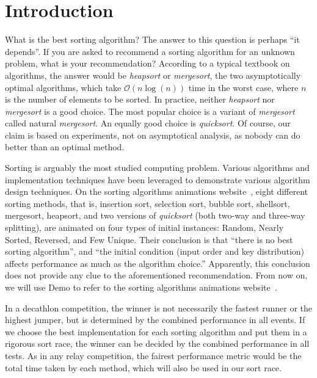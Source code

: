 \documentclass[AMA,STIX1COL]{WileyNJD-v2}
\newcommand{\qusort}{\emph{quicksort }}
\newcommand{\qusortn}{\emph{quicksort}}
\newcommand{\msort}{\emph{mergesort }}
\newcommand{\msortn}{\emph{mergesort}}
\begin{document}
\section{Introduction}\label{sec1}

What is the best sorting algorithm?
The answer to this question is perhaps ``it depends”.  
If you are asked to recommend a sorting algorithm for an unknown problem, what is your recommendation?
According to a typical textbook on algorithms, the answer would be \emph{heapsort} or \msortn, the two asymptotically optimal algorithms, which take $\mathcal{O}(n\log(n))$ time in the worst case, where $n$ is the number of elements to be sorted. 
In practice, neither \emph{heapsort} nor \msort is a good choice. 
The most popular choice is a variant of \msort called natural \msortn. 
An equally good choice is \qusortn. 
Of course, our claim is based on experiments, not on asymptotical analysis, as nobody can do better than an optimal method. 

Sorting is arguably the most studied computing problem. 
Various algorithms and implementation techniques have been leveraged to demonstrate various algorithm design techniques.  
On the sorting algorithms animations website~\cite{animations}, eight different sorting methods, that is, insertion sort, selection sort, bubble sort, shellsort, mergesort, heapsort, and two versions of \qusort (both two-way and three-way splitting), are animated on four types of initial instances: Random, Nearly Sorted, Reversed, and Few Unique. 
Their conclusion is that “there is no best sorting algorithm”, and “the initial condition (input order and key distribution) affects performance as much as the algorithm choice.” 
Apparently, this conclusion does not provide any clue to the aforementioned recommendation. 
From now on, we will use Demo to refer to the sorting algorithms animations website~\cite{animations}.

In a decathlon competition, the winner is not necessarily the fastest runner or the highest jumper, but is determined by the combined performance in all events. 
If we choose the best implementation for each sorting algorithm and put them in a rigorous sort race, the winner can be decided by the combined performance in all tests. 
As in any relay competition, the fairest performance metric would be the total time taken by each method, which will also be used in our sort race. 
\end{document}
